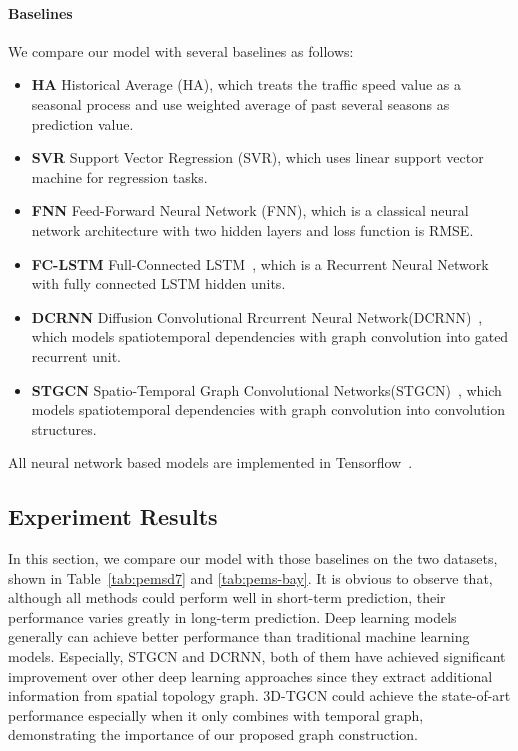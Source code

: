 \documentclass{article}
\begin{document}
\paragraph{Baselines}
We compare our model with several baselines as follows:
\begin{itemize}
\item \textbf{HA}  Historical Average (HA), which treats the traffic speed value as a seasonal process and use weighted average of past several seasons as prediction value.
\item \textbf{SVR} Support Vector Regression (SVR), which uses linear support vector machine for regression tasks.
\item \textbf{FNN} Feed-Forward Neural Network (FNN), which is a classical neural network architecture with two hidden layers and loss function is RMSE.
\item \textbf{FC-LSTM} Full-Connected LSTM~\cite{sutskever2014sequence}, which is a Recurrent Neural Network with fully connected LSTM hidden units.
\item \textbf{DCRNN} Diffusion Convolutional Rrcurrent Neural Network(DCRNN)~\cite{li2018diffusion}, which models spatiotemporal dependencies with graph convolution into gated recurrent unit.
\item \textbf{STGCN} Spatio-Temporal Graph Convolutional Networks(STGCN)~\cite{yuspatio}, which models spatiotemporal dependencies with graph convolution into convolution structures.
\end{itemize}
All neural network based models are implemented in  Tensorflow~\cite{abadi2016tensorflow}.

\subsection{Experiment Results}
In this section, we compare our model with those baselines on the two datasets, shown in Table~\ref{tab:pemsd7} and \ref{tab:pems-bay}. It is obvious to observe that,  although all methods could perform well in short-term prediction, their performance varies greatly in long-term prediction. Deep learning models generally can achieve better performance than traditional machine learning models. Especially, STGCN and DCRNN, both of them have achieved significant improvement over other deep learning approaches since they extract additional information from spatial topology graph.  3D-TGCN could achieve the state-of-art performance especially when it only combines with temporal graph, demonstrating the importance of our proposed graph construction.
\end{document}
